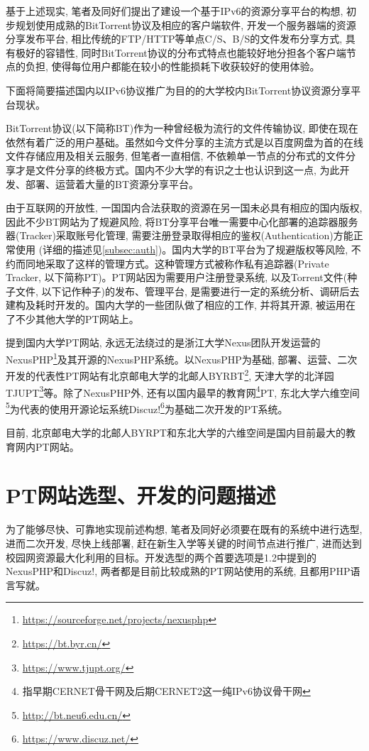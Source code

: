 基于上述现实, 笔者及同好们提出了建设一个基于IPv6的资源分享平台的构想, 初步规划使用成熟的BitTorrent协议及相应的客户端软件, 开发一个服务器端的资源分享发布平台, 相比传统的FTP/HTTP等单点C/S、B/S的文件发布分享方式, 具有极好的容错性, 同时BitTorrent协议的分布式特点也能较好地分担各个客户端节点的负担, 使得每位用户都能在较小的性能损耗下收获较好的使用体验。

下面将简要描述国内以IPv6协议推广为目的的大学校内BitTorrent协议资源分享平台现状。

BitTorrent协议\cite{cohen2003incentives}\cite{bramcohen2008bep0003}(以下简称BT)作为一种曾经极为流行的文件传输协议, 即使在现在依然有着广泛的用户基础。虽然如今文件分享的主流方式是以百度网盘为首的在线文件存储应用及相关云服务, 但笔者一直相信, 不依赖单一节点的分布式的文件分享才是文件分享的终极方式。国内不少大学的有识之士也认识到这一点, 为此开发、部署、运营着大量的BT资源分享平台。

由于互联网的开放性, 一国国内合法获取的资源在另一国未必具有相应的国内版权, 因此不少BT网站为了规避风险, 将BT分享平台唯一需要中心化部署的追踪器服务器(Tracker)采取账号化管理, 需要注册登录取得相应的鉴权(Authentication)方能正常使用 (详细的描述见\ref{subsec:auth})。国内大学的BT平台为了规避版权等风险, 不约而同地采取了这样的管理方式。这种管理方式被称作私有追踪器(Private Tracker, 以下简称PT)。PT网站因为需要用户注册登录系统, 以及Torrent文件(种子文件, 以下记作种子)的发布、管理平台, 是需要进行一定的系统分析、调研后去建构及耗时开发的。国内大学的一些团队做了相应的工作, 并将其开源, 被运用在了不少其他大学的PT网站上。

提到国内大学PT网站, 永远无法绕过的是浙江大学Nexus团队开发运营的NexusPHP\footnote{\url{https://sourceforge.net/projects/nexusphp}}及其开源的NexusPHP系统。以NexusPHP为基础, 部署、运营、二次开发的代表性PT网站有北京邮电大学的北邮人BYRBT\footnote{\url{https://bt.byr.cn/}}, 天津大学的北洋园TJUPT\footnote{\url{https://www.tjupt.org/}}等。除了NexusPHP外, 还有以国内最早的教育网\footnote{指早期CERNET骨干网及后期CERNET2这一纯IPv6协议骨干网}PT, 东北大学六维空间\footnote{\url{http://bt.neu6.edu.cn/}}为代表的使用开源论坛系统Discuz!\footnote{\url{https://www.discuz.net/}}为基础二次开发的PT系统。

目前, 北京邮电大学的北邮人BYRPT和东北大学的六维空间是国内目前最大的教育网内PT网站。

\section{PT网站选型、开发的问题描述}
\label{sec:related_work}
为了能够尽快、可靠地实现前述构想, 笔者及同好必须要在既有的系统中进行选型, 进而二次开发, 尽快上线部署, 赶在新生入学等关键的时间节点进行推广, 进而达到校园网资源最大化利用的目标。开发选型的两个首要选项是1.2中提到的NexusPHP和Discuz!, 两者都是目前比较成熟的PT网站使用的系统, 且都用PHP语言写就。

